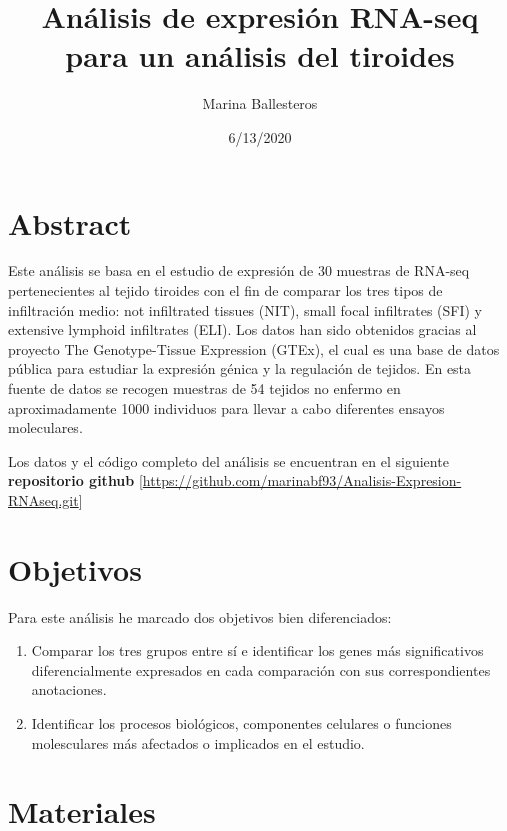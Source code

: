 \documentclass[]{article}
\title{Análisis de expresión RNA-seq para un análisis del tiroides}
\author{Marina Ballesteros}
\date{6/13/2020}
\begin{document}
\maketitle

{
\setcounter{tocdepth}{2}
\tableofcontents
}
\hypertarget{abstract}{%
\section{Abstract}\label{abstract}}

Este análisis se basa en el estudio de expresión de 30 muestras de
RNA-seq pertenecientes al tejido tiroides con el fin de comparar los
tres tipos de infiltración medio: not infiltrated tissues (NIT), small
focal infiltrates (SFI) y extensive lymphoid infiltrates (ELI). Los
datos han sido obtenidos gracias al proyecto The Genotype-Tissue
Expression (GTEx), el cual es una base de datos pública para estudiar la
expresión génica y la regulación de tejidos. En esta fuente de datos se
recogen muestras de 54 tejidos no enfermo en aproximadamente 1000
individuos para llevar a cabo diferentes ensayos moleculares.

Los datos y el código completo del análisis se encuentran en el
siguiente \textbf{repositorio github}
{[}\url{https://github.com/marinabf93/Analisis-Expresion-RNAseq.git}{]}

\hypertarget{objetivos}{%
\section{Objetivos}\label{objetivos}}

Para este análisis he marcado dos objetivos bien diferenciados:

\begin{enumerate}
\def\labelenumi{\alph{enumi})}
\item
  Comparar los tres grupos entre sí e identificar los genes más
  significativos diferencialmente expresados en cada comparación con sus
  correspondientes anotaciones.
\item
  Identificar los procesos biológicos, componentes celulares o funciones
  molesculares más afectados o implicados en el estudio.
\end{enumerate}

\hypertarget{materiales}{%
\section{Materiales}\label{materiales}}
\end{document}
